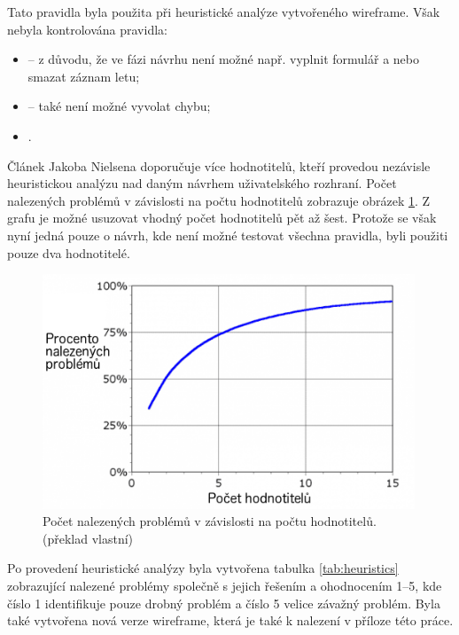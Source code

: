 \documentclass[thesis=M,czech]{FITthesis}[2012/06/26]
\begin{document}
Tato pravidla byla použita při heuristické analýze vytvořeného wireframe. Však nebyla kontrolována pravidla:
\begin{itemize}
\item {} -- z důvodu, že ve fázi návrhu není možné např. vyplnit formulář a nebo smazat záznam letu;
\item {} -- také není možné vyvolat chybu;
\item {}.
\end{itemize}

Článek Jakoba Nielsena \cite{howtoheuristic} doporučuje více hodnotitelů, kteří provedou nezávisle heuristickou analýzu nad daným návrhem uživatelského rozhraní. Počet nalezených problémů v závislosti na počtu hodnotitelů zobrazuje obrázek \ref{fig:heur}. Z grafu je možné usuzovat vhodný počet hodnotitelů pět až šest. Protože se však nyní jedná pouze o návrh, kde není možné testovat všechna pravidla, byli použiti pouze dva hodnotitelé.

\begin{figure}[h]\centering
 \includegraphics[width=0.99\textwidth]{./pictures/heur_eval_finding_curve_trans}
 \caption[Počet nalezených problémů v závislosti na počtu hodnotitelů]{Počet nalezených problémů v závislosti na počtu hodnotitelů. \cite{heur-eval-curve} (překlad vlastní)}\label{fig:heur}
\end{figure}

Po provedení heuristické analýzy byla vytvořena tabulka \ref{tab:heuristics} zobrazující nalezené problémy společně s jejich řešením a ohodnocením 1--5, kde číslo 1 identifikuje pouze drobný problém a číslo 5 velice závažný problém. Byla také vytvořena nová verze wireframe, která je také k nalezení v příloze této práce.
\end{document}
